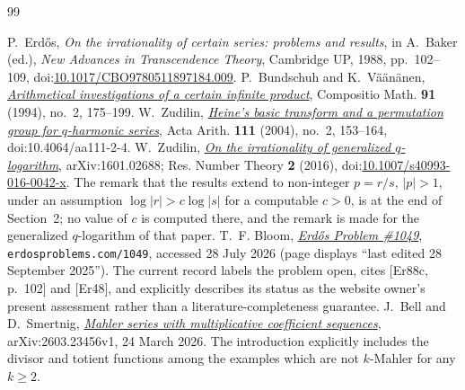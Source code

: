 \documentclass[11pt]{article}
\begin{document}
\begin{thebibliography}{99}
\small
\raggedright
\setlength{\itemsep}{0pt}
 P.~Erd\H{o}s, \emph{On the irrationality of certain series:
  problems and results}, in A.~Baker (ed.), \emph{New Advances in Transcendence
  Theory}, Cambridge UP, 1988, pp.~102--109,
  doi:\href{https://doi.org/10.1017/CBO9780511897184.009}{10.1017/CBO9780511897184.009}.
 P.~Bundschuh and K.~V\"a\"an\"anen,
  \href{https://numdam.org/item/CM_1994__91_2_175_0.pdf}{\emph{Arithmetical
  investigations of a certain infinite product}},
  Compositio Math. \textbf{91} (1994), no.~2, 175--199.
 W.~Zudilin,
  \href{https://geodesic.mathdoc.fr/articles/10.4064/aa111-2-4/}{\emph{Heine's
  basic transform and a permutation group for \(q\)-harmonic series}},
  Acta Arith. \textbf{111} (2004), no.~2, 153--164,
  doi:10.4064/aa111-2-4.
 W.~Zudilin,
  \href{https://arxiv.org/abs/1601.02688}{\emph{On the irrationality of
  generalized \(q\)-logarithm}}, arXiv:1601.02688; Res. Number Theory
  \textbf{2} (2016),
  doi:\href{https://doi.org/10.1007/s40993-016-0042-x}{10.1007/s40993-016-0042-x}.
  The remark that the results extend to non-integer \(p=r/s\), \(|p|>1\), under
  an assumption \(\log|r|>c\log|s|\) for a computable \(c>0\), is at the end of
  Section~2; no value of \(c\) is computed there, and the remark is made for the
  generalized \(q\)-logarithm of that paper.
 T.~F. Bloom,
  \href{https://www.erdosproblems.com/1049}{\emph{Erd\H{o}s Problem \#1049}},
  \texttt{erdosproblems.com/1049}, accessed 28 July 2026
  (page displays ``last edited 28 September 2025'').  The current record
  labels the problem open, cites \textup{[Er88c, p.~102]} and \textup{[Er48]},
  and explicitly describes its status as the website owner's present
  assessment rather than a literature-completeness guarantee.
 J.~Bell and D.~Smertnig,
  \href{https://arxiv.org/abs/2603.23456}{\emph{Mahler series with
  multiplicative coefficient sequences}}, arXiv:2603.23456v1,
  24 March 2026.  The introduction explicitly includes the divisor and
  totient functions among the examples which are not $k$-Mahler for any
  $k\ge2$.
\end{thebibliography}
\end{document}
